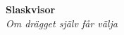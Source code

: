 \begin{center}
    \vspace*{1.5cm}
    {\fontsize{20}{20}\textbf{Slaskvisor}}\\
    \vspace{0.7cm}
    {\fontsize{12}{12}\textit{Om drägget själv får välja}}
\end{center}
\noBackground

\newpage
\noBackground

